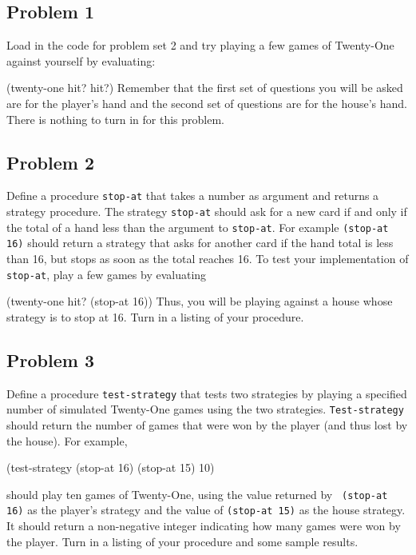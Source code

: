 \subsection{Problem 1}

Load in the code for problem set 2 and try playing a few games of
Twenty-One against yourself by evaluating:

\beginlisp
(twenty-one hit? hit?)
\endlisp
Remember that the first set of questions you will be asked are for the
player's hand and the second set of questions are for the house's hand.
There is nothing to turn in for this problem.

\subsection{Problem 2}

Define a procedure {\tt stop-at} that takes a number as argument and
returns a strategy procedure.  The strategy {\tt stop-at} should ask
for a new card if and only if the total of a hand less than the
argument to {\tt stop-at}.  For example {\tt (stop-at 16)} should
return a strategy that asks for another card if the hand total is less
than 16, but stops as soon as the total reaches 16.  To test your
implementation of {\tt stop-at}, play a few games by evaluating

\beginlisp
(twenty-one hit? (stop-at 16))
\endlisp
Thus, you will be playing against a house whose strategy is to stop at
16.  Turn in a listing of your procedure.

\subsection{Problem 3}

Define a procedure {\tt test-strategy} that tests two strategies by
playing a specified number of simulated Twenty-One games using the two
strategies.  {\tt Test-strategy} should return the number of games
that were won by the player (and thus lost by the house). For example,

\beginlisp
(test-strategy (stop-at 16) (stop-at 15) 10)
\endlisp

\noindent
should play ten games of Twenty-One, using the value returned by {\tt
(stop-at 16)} as the player's strategy and the value of {\tt (stop-at
15)} as the house strategy. It should return a non-negative integer
indicating how many games were won by the player.  Turn in a listing
of your procedure and some sample results.

